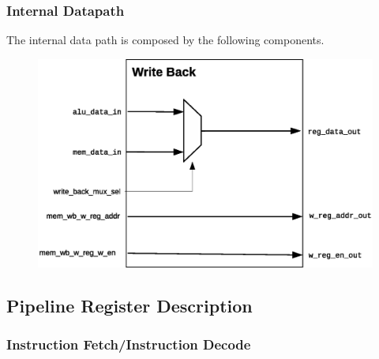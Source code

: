 \documentclass{article}
\begin{document}
  \subsubsection{Internal Datapath} 
  The internal data path is composed by the following components.

  \begin{figure}[H]
    \centering
    \includegraphics[width=\linewidth]{pictures/datapath/wb_datapath.eps}
  \end{figure}      
  
  \newpage
  \subsection{Pipeline Register Description}
  \subsubsection{Instruction Fetch/Instruction Decode}
\end{document}
